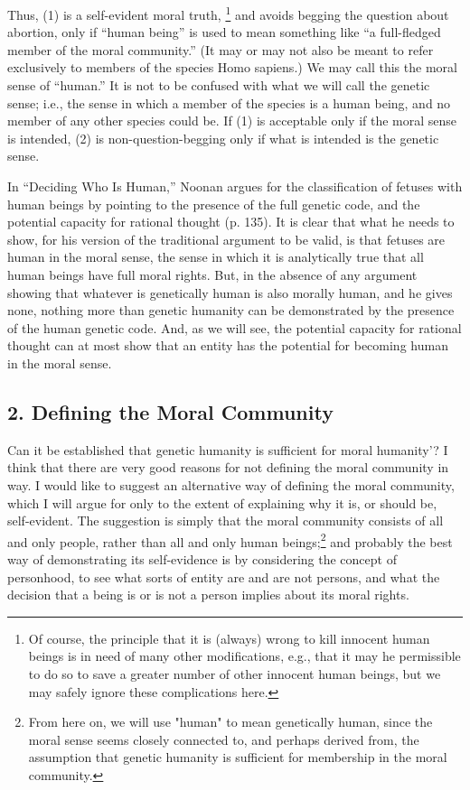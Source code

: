 Thus, (1) is a self-evident moral truth, \footnote{Of course, the principle that it is (always) wrong to kill
innocent human beings is in need of many other modifications,
e.g., that it may he permissible to do so to save a greater number
of other innocent human beings, but we may safely ignore these
complications here.} and avoids
begging the question about abortion, only if “human
being” is used to mean something like “a full-fledged
member of the moral community.” (It may or may not
also be meant to refer exclusively to members of the
species Homo sapiens.) We may call this the moral sense
of “human.” It is not to be confused with what we will
call the genetic sense; i.e., the sense in which a member of
the species is a human being, and no member of any other
species could be. If (1) is acceptable only if the moral
sense is intended, (2) is non-question-begging only if
what is intended is the genetic sense.

In “Deciding Who Is Human,” Noonan argues for the
classification of fetuses with human beings by pointing to
the presence of the full genetic code, and the potential
capacity for rational thought (p. 135). It is clear that what
he needs to show, for his version of the traditional
argument to be valid, is that fetuses are human in the
moral sense, the sense in which it is analytically true that
all human beings have full moral rights. But, in the
absence of any argument showing that whatever is
genetically human is also morally human, and he gives
none, nothing more than genetic humanity can be
demonstrated by the presence of the human genetic code.
And, as we will see, the potential capacity for rational
thought can at most show that an entity has the potential
for becoming human in the moral sense.

\subsection{2. Defining the Moral Community}

Can it be established that genetic humanity is sufficient
for moral humanity’? I think that there are very good
reasons for not defining the moral community in way. I
would like to suggest an alternative way of defining the
moral community, which I will argue for only to the
extent of explaining why it is, or should be, self-evident.
The suggestion is simply that the moral community
consists of all and only people, rather than all and only
human beings;\footnote{From here on, we will use "human" to mean genetically
human, since the moral sense seems closely connected to, and perhaps derived from, the assumption that genetic humanity is
sufficient for membership in the moral community.} and probably the best way of
demonstrating its self-evidence is by considering the
concept of personhood, to see what sorts of entity are and
are not persons, and what the decision that a being is or is
not a person implies about its moral rights.


